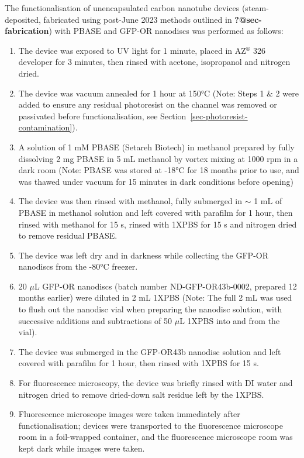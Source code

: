 \documentclass[
  a4paper,
]{scrbook}
\begin{document}
The functionalisation of unencapsulated carbon nanotube devices
(steam-deposited, fabricated using post-June 2023 methods outlined in
\textbf{?@sec-fabrication}) with PBASE and GFP-OR nanodiscs was
performed as follows:

\begin{enumerate}
\def\labelenumi{\arabic{enumi}.}
\item
  The device was exposed to UV light for 1 minute, placed in
  AZ\(^\circledR\) 326 developer for 3 minutes, then rinsed with
  acetone, isopropanol and nitrogen dried.
\item
  The device was vacuum annealed for 1 hour at 150°C (Note: Steps 1 \& 2
  were added to ensure any residual photoresist on the channel was
  removed or passivated before functionalisation, see
  Section~\ref{sec-photoresist-contamination}).
\item
  A solution of 1 mM PBASE (Setareh Biotech) in methanol prepared by
  fully dissolving 2 mg PBASE in 5 mL methanol by vortex mixing at 1000
  rpm in a dark room (Note: PBASE was stored at -18°C for 18 months
  prior to use, and was thawed under vacuum for 15 minutes in dark
  conditions before opening)
\item
  The device was then rinsed with methanol, fully submerged in \(\sim\)
  1 mL of PBASE in methanol solution and left covered with parafilm for
  1 hour, then rinsed with methanol for 15 s, rinsed with 1XPBS for 15 s
  and nitrogen dried to remove residual PBASE.
\item
  The device was left dry and in darkness while collecting the GFP-OR
  nanodiscs from the -80°C freezer.
\item
  20 \(\mu\)L GFP-OR nanodiscs (batch number ND-GFP-OR43b-0002, prepared
  12 months earlier) were diluted in 2 mL 1XPBS (Note: The full 2 mL was
  used to flush out the nanodisc vial when preparing the nanodisc
  solution, with successive additions and subtractions of 50 \(\mu\)L
  1XPBS into and from the vial).
\item
  The device was submerged in the GFP-OR43b nanodisc solution and left
  covered with parafilm for 1 hour, then rinsed with 1XPBS for 15 s.
\item
  For fluorescence microscopy, the device was briefly rinsed with DI
  water and nitrogen dried to remove dried-down salt residue left by the
  1XPBS.
\item
  Fluorescence microscope images were taken immediately after
  functionalisation; devices were transported to the fluorescence
  microscope room in a foil-wrapped container, and the fluorescence
  microscope room was kept dark while images were taken.
\end{enumerate}
\end{document}
